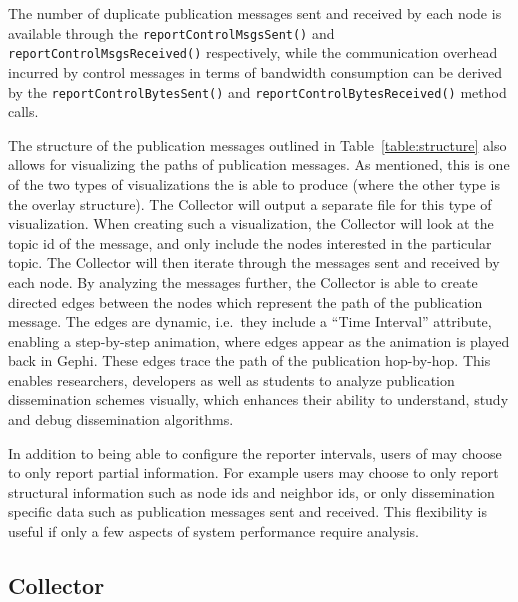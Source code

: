 The number of duplicate publication messages sent and received by each
node is available through the \texttt{reportControlMsgsSent()}  and
\texttt{reportControlMsgsReceived()} respectively, while the communication
overhead incurred by control messages in terms of bandwidth consumption can be
derived by the \texttt{reportControlBytesSent()} and
\texttt{reportControlBytesReceived()} method calls.



The structure of the publication messages outlined in
Table~\ref{table:structure} also allows for visualizing the paths of
publication messages. As mentioned, this is one of the two types of
visualizations the \demo{} is able to produce (where the other type is
the overlay structure). The Collector will output a separate \gexf{}
file for this type of visualization. When creating such a visualization,
the Collector will look at the topic id of the message, and only include
the nodes interested in the particular topic. The Collector will then
iterate through the messages sent and received by each node. By
analyzing the messages further, the Collector is able to create directed
edges between the nodes which represent the path of the publication
message. The edges are dynamic, i.e.\ they include a ``Time Interval''
attribute, enabling a step-by-step animation, where edges appear as the
animation is played back in Gephi. These edges trace
the path of the publication hop-by-hop. This enables researchers,
developers as well as students to analyze publication dissemination
schemes visually, which enhances their ability to understand, study and
debug dissemination algorithms.

In addition to being able to configure the reporter intervals, users of
\demo{} may choose to only report partial information. For example users
may choose to only report structural information such as node ids and
neighbor ids, or only dissemination specific data such as publication
messages sent and received. This flexibility is useful if only a few
aspects of system performance require analysis.

\subsection{Collector}
\label{sec:collector}

